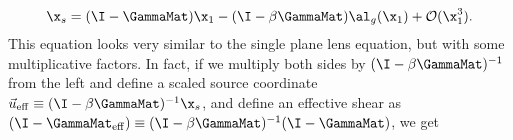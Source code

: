 \begin{equation}
\x_s = (\I - \GammaMat) \x_1  - (\I - \beta \GammaMat)\al_g(\x_1) + \mathcal{O}(\x_1^3).
\label{eq:background}
\end{equation}
This equation looks very similar to the single plane lens equation, but with some multiplicative factors. In fact, if we multiply both sides by $(\I - \beta \GammaMat)^{-1}$ from the left and define a scaled source coordinate $\vec{u}_{\rm eff} \equiv (\I - \beta \GammaMat)^{-1} \x_s$, and define an effective shear as $(\I -\GammaMat_{\rm eff}) \equiv (\I - \beta\GammaMat)^{-1} (\I - \GammaMat)$, we get
  